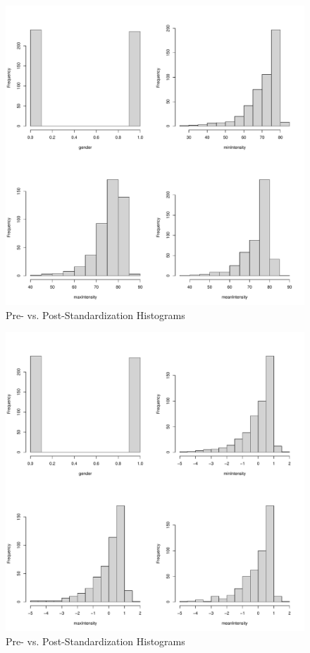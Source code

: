 \documentclass[
]{article}
\begin{document}
\begin{figure}

{\centering \includegraphics[width=1\linewidth,height=1\textheight]{figure/histPlots-3} 

}

\caption{\label{fig:histPlots}Pre- vs. Post-Standardization Histograms}\label{fig:histPlots-3}
\end{figure}
\begin{figure}

{\centering \includegraphics[width=1\linewidth,height=1\textheight]{figure/histPlots-4} 

}

\caption{\label{fig:histPlots}Pre- vs. Post-Standardization Histograms}\label{fig:histPlots-4}
\end{figure}
\end{document}
